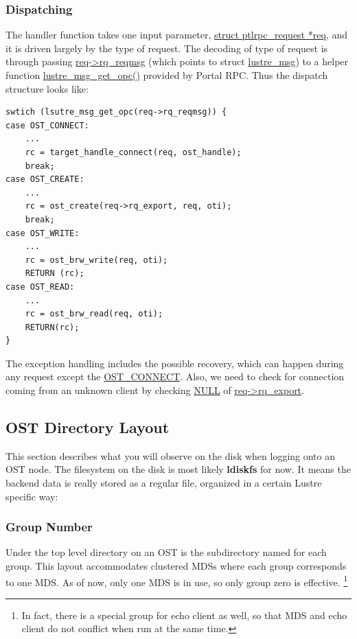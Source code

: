 \subsubsection*{Dispatching}

The handler function takes one input parameter, \url{struct ptlrpc_request
*req}, and it is driven largely by the type of request.  The decoding of type of
request is through passing \url{req->rq_reqmsg} (which points to struct
\url{lustre_msg}) to a helper function \url{lustre_msg_get_opc()} provided by
Portal RPC. Thus the dispatch structure looks like:

\begin{Verbatim}
swtich (lsutre_msg_get_opc(req->rq_reqmsg)) {
case OST_CONNECT: 
    ...
    rc = target_handle_connect(req, ost_handle);
    break;
case OST_CREATE:
    ...
    rc = ost_create(req->rq_export, req, oti);
    break;
case OST_WRITE:
    ...
    rc = ost_brw_write(req, oti);
    RETURN (rc);
case OST_READ:
    ...
    rc = ost_brw_read(req, oti);
    RETURN(rc);
}
\end{Verbatim}

The exception handling includes the possible recovery, which can happen during
any request except the \url{OST_CONNECT}. Also, we need to check for connection
coming from an unknown client by checking \url{NULL} of \url{req->rq_export}.


\subsection{OST Directory Layout}

This section describes what you will observe on the disk when logging onto an OST
node. The filesystem on the disk is most likely \textbf{ldiskfs} for now. It
means the backend data is really stored as a regular file, organized in a
certain Lustre specific way:

\subsubsection*{Group Number}

Under the top level directory on an OST is the subdirectory named for each group. 
This layout accommodates clustered MDSs where each group corresponds to
one MDS. As of now, only one MDS is in use, so only group zero is effective.
\footnote{In fact, there is a special group for echo client as well, so that
MDS and echo client do not conflict when run at the same time.}

